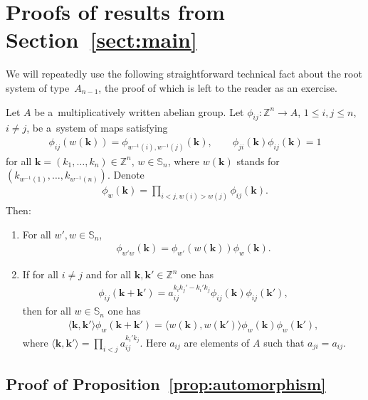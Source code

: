 \section{Proofs of results from Section~\ref{sect:main}}

We will repeatedly use the following straightforward technical fact about the root system of type~$A_{n-1}$, the proof
of which is left to the reader as an exercise.
\begin{claim}
\label{claim:cocycle}
Let $A$ be a~multiplicatively written abelian group.
Let $\phi_{ij}\colon \mathbb Z^n\to A$, $1\le i,j\le n$, $i\ne j$, be a~system of maps satisfying
\begin{gather*}
\phi_{ij}(w(\mathbf k)) = \phi_{w^{-1}(i),w^{-1}(j)}(\mathbf k),
\qquad
\phi_{ji}(\mathbf k)\phi_{ij}(\mathbf k)=1
\end{gather*}
for all $\mathbf k=(k_1,\ldots,k_n)\in\mathbb Z^n$, $w\in\mathbb S_n$, where $w(\mathbf k)$ stands for
$(k_{w^{-1}(1)},\ldots,k_{w^{-1}(n)})$.
Denote
\begin{gather*}
\phi_w(\mathbf k) = \prod\limits_{i<j,w(i)>w(j)} \phi_{ij}(\mathbf k).
\end{gather*}
Then:
\begin{enumerate}\itemsep=0pt
\item[$(a)$] For all $w',w\in \mathbb S_n$,
\begin{gather*}
\phi_{w'w}(\mathbf k) = \phi_{w'}(w(\mathbf k))\phi_w(\mathbf k).
\end{gather*}

\item[$(b)$] If for all $i\ne j$ and for all $\mathbf k,\mathbf{k'}\in \mathbb Z^n$ one has
\begin{gather*}
\phi_{ij}(\mathbf k+\mathbf{k'}) = a_{ij}^{k_ik_j'- k_i'k_j} \phi_{ij}(\mathbf k)\phi_{ij}(\mathbf{k'}),
\end{gather*}
then for all $w\in \mathbb S_n$ one has
\begin{gather*}
\langle \mathbf k,\mathbf{k'}\rangle \phi_{w}(\mathbf k+\mathbf{k'}) = \langle w(\mathbf k),w(\mathbf{k'})\rangle
\phi_{w}(\mathbf k)\phi_{w}(\mathbf{k'}),
\end{gather*}
where $\langle \mathbf k,\mathbf{k'}\rangle= \prod\limits_{i<j}a_{ij}^{k_i'k_j}$.
Here $a_{ij}$ are elements of $A$ such that $a_{ji}=a_{ij}$.
\end{enumerate}
\end{claim}

\subsection*{Proof of Proposition~\ref{prop:automorphism}}

